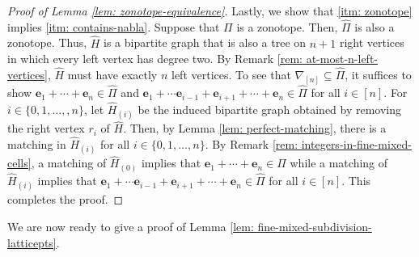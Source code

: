 \documentclass[12pt,reqno]{article}%
\theoremstyle{definition}
\numberwithin{equation}{section}
\newcommand{\bbe}{\mathbf{e}}
\begin{document}
\begin{proof}[Proof of Lemma \ref{lem: zonotope-equivalence}]
Lastly, we show that \eqref{itm: zonotope} implies \eqref{itm: contains-nabla}. Suppose that $\Pi$ is a zonotope. Then, $\hat{\Pi}$ is also a zonotope. Thus, $\hat{H}$ is a bipartite graph that is also a tree on $n+1$ right vertices in which every left vertex has degree two. By Remark \ref{rem: at-most-n-left-vertices}, $\hat{H}$ must have exactly $n$ left vertices. To see that $\nabla_{[n]} \subseteq \hat{\Pi}$, it suffices to show  $\bbe_1 + \cdots + \bbe_n \in \hat{\Pi}$ and $\bbe_1 + \cdots \bbe_{i-1} + \bbe_{i+1} + \cdots + \bbe_n\in \hat{\Pi}$ for all $i \in [n]$. For $i \in \{0, 1, \dots, ,n\}$, let $\hat{H}_{(i)}$ be the induced bipartite graph obtained by removing the right vertex $r_i$ of $\hat{H}$. Then, by Lemma \ref{lem: perfect-matching}, there is a matching in $\hat{H}_{(i)}$ for all $i \in \{0, 1, \dots, n\}$. By Remark \ref{rem: integers-in-fine-mixed-cells}, a matching of $\hat{H}_{(0)}$ implies that $\bbe_1 + \cdots + \bbe_n \in \hat{\Pi}$ while a matching of $\hat{H}_{(i)}$ implies that $\bbe_1 + \cdots \bbe_{i-1} + \bbe_{i+1} + \cdots + \bbe_n\in \hat{\Pi}$ for all $i \in [n]$. This completes the proof.
\end{proof}

We are now ready to give a proof of Lemma \ref{lem: fine-mixed-subdivision-latticepts}.
\end{document}
